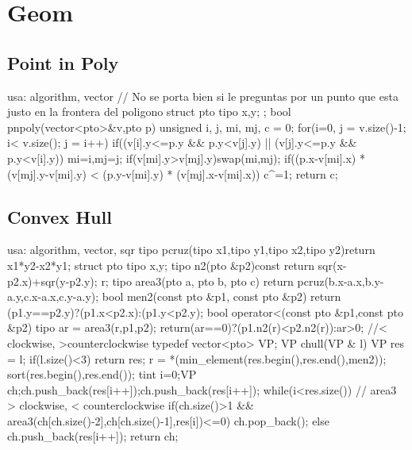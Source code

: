 \documentclass[10pt,landscape,twocolumn,a4paper,notitlepage]{article}
\begin{document}
\section{Geom}\subsection{Point in Poly}\begin{code}
usa: algorithm, vector
// No se porta bien si le preguntas por un punto que esta justo en la frontera del poligono
struct pto { tipo x,y; };
bool pnpoly(vector<pto>&v,pto p){
  unsigned i, j, mi, mj, c = 0;
  for(i=0, j = v.size()-1; i< v.size(); j = i++){
    if((v[i].y<=p.y && p.y<v[j].y) ||
       (v[j].y<=p.y && p.y<v[i].y)){
      mi=i,mj=j; if(v[mi].y>v[mj].y)swap(mi,mj);
      if((p.x-v[mi].x) * (v[mj].y-v[mi].y)
       < (p.y-v[mi].y) * (v[mj].x-v[mi].x)) c^=1;
    }
  } return c;
}
\end{code}\subsection{Convex Hull}\begin{code}
usa: algorithm, vector, sqr
tipo pcruz(tipo x1,tipo y1,tipo x2,tipo y2){return x1*y2-x2*y1;}
struct pto {
  tipo x,y;
  tipo n2(pto &p2)const{
    return sqr(x-p2.x)+sqr(y-p2.y);
  }
} r;
tipo area3(pto a, pto b, pto c){
  return pcruz(b.x-a.x,b.y-a.y,c.x-a.x,c.y-a.y);
}
bool men2(const pto &p1, const pto &p2){
  return (p1.y==p2.y)?(p1.x<p2.x):(p1.y<p2.y);
}
bool operator<(const pto &p1,const pto &p2){
  tipo ar = area3(r,p1,p2);
  return(ar==0)?(p1.n2(r)<p2.n2(r)):ar>0;
  //< clockwise, >counterclockwise
}
typedef vector<pto> VP;
VP chull(VP & l){
  VP res = l;  if(l.size()<3) return res;
  r = *(min_element(res.begin(),res.end(),men2));
  sort(res.begin(),res.end());
  tint i=0;VP ch;ch.push_back(res[i++]);ch.push_back(res[i++]);
  while(i<res.size())  // area3 > clockwise, < counterclockwise
    if(ch.size()>1 && area3(ch[ch.size()-2],ch[ch.size()-1],res[i])<=0)
      ch.pop_back();
    else
      ch.push_back(res[i++]);
  return ch;
}
\end{code}
\end{document}
